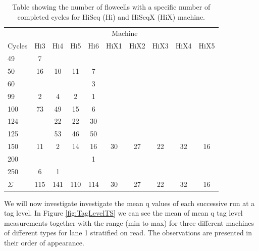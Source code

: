 \documentclass[a4paper,11pt,fleqn,twoside,notitlepage]{report}\usepackage[]{graphicx}\usepackage[]{color}
\begin{document}
\begin{table}[!t]
\centering
\caption{Table showing the number of flowcells with a specific number of completed cycles for HiSeq (Hi) and HiSeqX (HiX) machine.} 
\begin{tabular}{lccccccccc}
  \toprule 
  & \multicolumn{9}{c}{Machine} \\ \cmidrule(r){2-10} 
Cycles & Hi3 & Hi4 & Hi5 & Hi6 & HiX1 & HiX2 & HiX3 & HiX4 & HiX5 \\ 
  \midrule
49 & 7 &  &  &  &  &  &  &  &  \\ 
  50 & 16 & 10 & 11 & 7 &  &  &  &  &  \\ 
  60 &  &  &  & 3 &  &  &  &  &  \\ 
  99 & 2 & 4 & 2 & 1 &  &  &  &  &  \\ 
  100 & 73 & 49 & 15 & 6 &  &  &  &  &  \\ 
  124 &  & 22 & 22 & 30 &  &  &  &  &  \\ 
  125 &  & 53 & 46 & 50 &  &  &  &  &  \\ 
  150 & 11 & 2 & 14 & 16 & 30 & 27 & 22 & 32 & 16 \\ 
  200 &  &  &  & 1 &  &  &  &  &  \\ 
  250 & 6 & 1 &  &  &  &  &  &  &  \\ 
  \midrule
  $\Sigma$ & 115 & 141 & 110 & 114 & 30 & 27 & 22 & 32 & 16 \\ 
   \bottomrule
\end{tabular}
\label{CompCycl}
\end{table}

We will now investigate investigate the mean q values of each successive run at a tag level. In Figure \ref{fig:TagLevelTS} we can see the mean of mean q tag level measurements together with the range (min to max) for three different machines of different types for lane 1 stratified on read. The observations are presented in their order of appearance.
\end{document}
